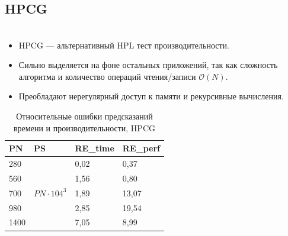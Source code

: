 \documentclass[unicode, t, 11pt]{beamer}%
\newlength{\mylen}
\begin{document}
		\subsection{HPCG}
			\begin{frame}
				\footnotesize
				\frametitle{\insertsection}
		 		\framesubtitle{\insertsubsection}
		 		\begin{columns}[T]
		 			\setlength{\mylen}{0.53\textwidth}
		 			\begin{column}{\mylen}
		 				\begin{itemize}[label = \(\bullet\)]
					 		\item HPCG — альтернативный HPL тест производительности.
					 		\item Сильно выделяется на фоне остальных приложений, так как сложность алгоритма и количество операций чтения/записи \(\mathcal{O}(N)\).
					 		\item  Преобладают нерегулярный доступ к памяти и рекурсивные вычисления.
					 	\end{itemize}
					 	\begin{table}
				 			\captionsetup{font=tiny, labelfont=tiny}
				 			\tiny
								\begin{tabularx}{\textwidth}{|X|X|X|X|}
									\hline
								PN	& PS  & RE\_time & RE\_perf \\ \hline
								280 & \multirow{5}{*}{\(PN \cdot 104^3\)} & 0,02     & 0,37     \\ \cline{1-1} \cline{3-4}
								560 &     & 1,56     & 0,80     \\ \cline{1-1} \cline{3-4}
								700 &     & 1,89     & 13,07    \\ \cline{1-1} \cline{3-4}
								980	&     & 2,85     & 19,54    \\ \cline{1-1} \cline{3-4}
								1400 &    & 7,05     & 8,99     \\ \hline
								\end{tabularx}
							\caption{Относительные ошибки предсказаний времени и производительности, HPCG}
						\end{table}
					 			

\end{column}
\end{columns}
\end{frame}
\end{document}
